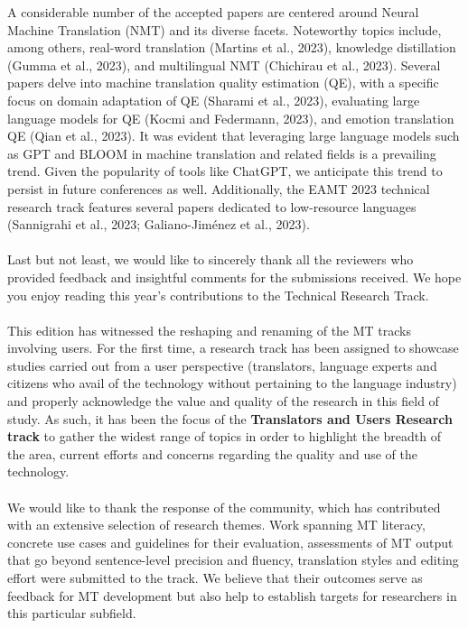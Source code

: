 \documentclass[a4paper,11pt,twoside]{book}
\begin{document}
\begin{onehalfspacing}
A considerable number of the accepted papers are centered around Neural Machine Translation (NMT) and its diverse facets. Noteworthy topics include, among others, real-word translation (Martins et al., 2023), knowledge distillation (Gumma et al., 2023), and multilingual NMT (Chichirau et al., 2023). Several papers delve into machine translation quality estimation (QE), with a specific focus on domain adaptation of QE (Sharami et al., 2023), evaluating large language models for QE (Kocmi and Federmann, 2023), and emotion translation QE (Qian et al., 2023). It was evident that leveraging large language models such as GPT and BLOOM in machine translation and related fields is a prevailing trend. Given the popularity of tools like ChatGPT, we anticipate this trend to persist in future conferences as well. Additionally, the EAMT 2023 technical research track features several papers dedicated to low-resource languages (Sannigrahi et al., 2023; Galiano-Jiménez et al., 2023).\\
\\
\noindent
Last but not least, we would like to sincerely thank all the reviewers who provided feedback and insightful comments for the submissions received. We hope you enjoy reading this year's contributions to the Technical Research Track.\\
\\
\noindent
This edition has witnessed the reshaping and renaming of the MT tracks involving users. For the first time, a research track has been assigned to showcase studies carried out from a user perspective (translators, language experts and citizens who avail of the technology without pertaining to the language industry) and properly acknowledge the value and quality of the  research in this field of study. As such, it has been the focus of the \textbf{Translators and Users Research track} to gather the widest range of topics in order to highlight the breadth of the area,  current efforts and concerns regarding the quality and use of the technology.\\
\\
\noindent
We would like to thank the response of the community, which has contributed with an extensive selection of research themes. Work spanning MT literacy, concrete use cases and guidelines for their evaluation, assessments of MT output that go beyond sentence-level precision and fluency, translation styles and editing effort were submitted to the track. We believe that their outcomes serve as feedback for MT development but also help to establish targets for researchers in this particular subfield.\\

\end{onehalfspacing}
\end{document}
